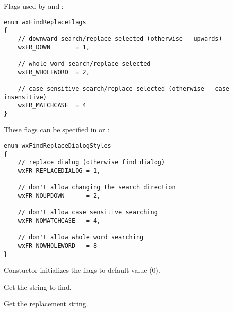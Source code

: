 
Flags used by 
 and
:

\begin{verbatim}
enum wxFindReplaceFlags
{
    // downward search/replace selected (otherwise - upwards)
    wxFR_DOWN       = 1,

    // whole word search/replace selected
    wxFR_WHOLEWORD  = 2,

    // case sensitive search/replace selected (otherwise - case insensitive)
    wxFR_MATCHCASE  = 4
}
\end{verbatim}

These flags can be specified in 
 or 
:

\begin{verbatim}
enum wxFindReplaceDialogStyles
{
    // replace dialog (otherwise find dialog)
    wxFR_REPLACEDIALOG = 1,

    // don't allow changing the search direction
    wxFR_NOUPDOWN      = 2,

    // don't allow case sensitive searching
    wxFR_NOMATCHCASE   = 4,

    // don't allow whole word searching
    wxFR_NOWHOLEWORD   = 8
}
\end{verbatim}


\label{wxfindreplacedatactor}


Constuctor initializes the flags to default value ($0$).

\label{wxfindreplacedatagetfindstring}


Get the string to find.

\label{wxfindreplacedatagetreplacestring}


Get the replacement string.

\label{wxfindreplacedatagetflags}

